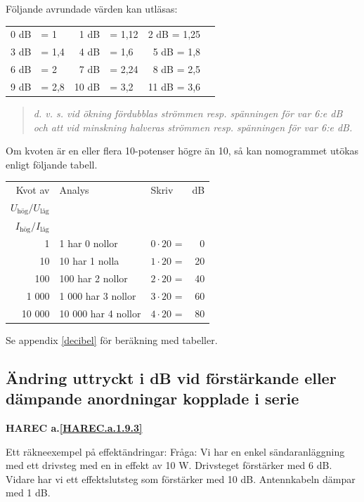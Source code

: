Följande avrundade värden kan utläsas:

\begin{tabular}{rlrlrl}
0 dB & = 1   &  1 dB & = 1,12 &  2 dB = 1,25 \\
3 dB & = 1,4 &  4 dB & = 1,6  &  5 dB = 1,8 \\
6 dB & = 2   &  7 dB & = 2,24 &  8 dB = 2,5 \\
9 dB & = 2,8 & 10 dB & = 3,2  & 11 dB = 3,6
\end{tabular}

\begin{quote}\emph{
d. v. s. vid ökning fördubblas strömmen resp. spänningen för var 6:e dB och att
vid minskning halveras strömmen resp. spänningen för var 6:e dB.
}\end{quote}

Om kvoten är en eller flera 10-potenser högre än 10, så kan nomogrammet utökas
enligt följande tabell.

\begin{tabular}{rllr}
Kvot av & Analys             & Skriv            & dB \\
\(U_\text{hög}/U_\text{låg}\) &          &                  &    \\
\(I_\text{hög}/I_\text{låg}\) &          &                  &    \\
     1 & 1 har 0 nollor      & \(0 \cdot 20\) = &  0 \\
    10 & 10 har 1 nolla      & \(1 \cdot 20\) = & 20 \\
   100 & 100 har 2 nollor    & \(2 \cdot 20\) = & 40 \\
 1 000 &  1 000 har 3 nollor & \(3 \cdot 20\) = & 60 \\
10 000 & 10 000 har 4 nollor & \(4 \cdot 20\) = & 80
\end{tabular}

Se appendix \ref{decibel} för beräkning med tabeller.

\subsection{Ändring uttryckt i dB vid förstärkande eller dämpande anordningar kopplade i serie}
\textbf{HAREC a.\ref{HAREC.a.1.9.3}\label{myHAREC.a.1.9.3}}

Ett räkneexempel på effektändringar:
Fråga:
Vi har en enkel sändaranläggning med ett drivsteg med en in effekt av 10 W.
Drivsteget förstärker med 6 dB. Vidare har vi ett effektslutsteg som förstärker
med 10 dB. Antennkabeln dämpar med 1 dB.

